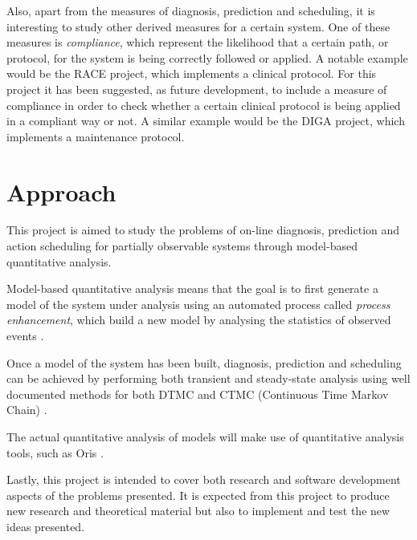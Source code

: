 \documentclass{article}
\begin{document}
        Also, apart from the measures of diagnosis, prediction and scheduling, it is interesting to study other derived measures for a certain system. One of these measures is \textit{compliance}, which represent the likelihood that a certain path, or protocol, for the system is being correctly followed or applied. A notable example would be the RACE project, which implements a clinical protocol. For this project it has been suggested, as future development, to include a measure of compliance in order to check whether a certain clinical protocol is being applied in a compliant way or not. A similar example would be the DIGA project, which implements a maintenance protocol.
    
    \section*{Approach}
        
        This project is aimed to study the problems of on-line diagnosis, prediction and action scheduling for partially observable systems through model-based quantitative analysis.
        
        Model-based quantitative analysis means that the goal is to first generate a model of the system under analysis using an automated process called \textit{process enhancement}, which build a new model by analysing the statistics of observed events \cite{van2004workflow}.
        
        Once a model of the system has been built, diagnosis, prediction and scheduling can be achieved by performing both transient and steady-state analysis using well documented methods for both DTMC and CTMC (Continuous Time Markov Chain) \cite{horvath2012transient, mascots16}.
        
        The actual quantitative analysis of models will make use of quantitative analysis tools, such as Oris \cite{bucci2010oris}.
        
        Lastly, this project is intended to cover both research and software development aspects of the problems presented. It is expected from this project to produce new research and theoretical material but also to implement and test the new ideas presented.
    
    \clearpage
    
	
	
\end{document}
